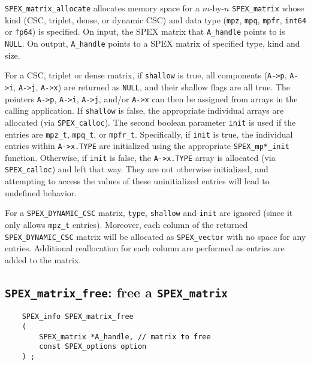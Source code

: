 \documentclass[12pt,oneside]{book}
\theoremstyle{definition}
\begin{document}
\verb|SPEX_matrix_allocate| allocates memory space for a $m$-by-$n$
\verb|SPEX_matrix| whose kind (CSC, triplet, dense, or dynamic CSC) and data type
(\verb|mpz|, \verb|mpq|, \verb|mpfr|, \verb|int64| or \verb|fp64|) is
specified. On input, the SPEX matrix that \verb|A_handle| points to is \verb|NULL|. 
On output, \verb|A_handle| points to a SPEX matrix of specified type, kind and size.

For a CSC, triplet or dense matrix, if \verb|shallow| is true, all components (\verb|A->p|, \verb|A->i|,
\verb|A->j|, \verb|A->x|) are returned as \verb|NULL|, and their shallow flags
are all true.  The pointers \verb|A->p|, \verb|A->i|, \verb|A->j|,
and/or \verb|A->x| can then be assigned from arrays in the calling application.
If \verb|shallow| is false, the appropriate individual arrays are allocated
(via \verb|SPEX_calloc|). The second boolean parameter \verb|init| is used if the entries
are \verb|mpz_t|, \verb|mpq_t|, or \verb|mpfr_t|. Specifically, if \verb|init|
is true, the individual entries within \verb|A->x.TYPE| are initialized using
the appropriate \verb|SPEX_mp*_init| function. Otherwise, if \verb|init| is
false, the \verb|A->x.TYPE| array is allocated (via \verb|SPEX_calloc|) and
left that way.  They are not otherwise initialized, and attempting to access
the values of these uninitialized entries will lead to undefined behavior.

For a \verb|SPEX_DYNAMIC_CSC| matrix, \verb|type|, \verb|shallow| and \verb|init| are ignored (since it only allows \verb|mpz_t| entries). Moreover, each column of the returned  \verb|SPEX_DYNAMIC_CSC| matrix will be
allocated as \verb|SPEX_vector| with no space for any entries.  Additional reallocation for each column are performed as
entries are added to the matrix.


\newpage
\subsection{\texttt{SPEX\_matrix\_free}: free a \texttt{SPEX\_matrix}} \label{s:user:matrix_free}
\begin{mdframed}[userdefinedwidth=\textwidth]
{\footnotesize
\begin{verbatim}
    SPEX_info SPEX_matrix_free
    (
        SPEX_matrix *A_handle, // matrix to free
        const SPEX_options option
    ) ;
\end{verbatim}
} \end{mdframed}
\end{document}
